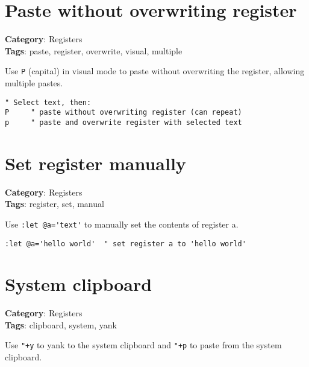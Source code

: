 {{{{{{{{{{\section{Paste without overwriting register}

\textbf{Category}: Registers\\ \textbf{Tags}: paste, register, overwrite, visual, multiple
\vspace{0.5cm}

Use {\footnotesize \Verb§P§} (capital) in visual mode to paste without overwriting the register, allowing multiple pastes.

\begin{Exa*}{}
\begin{Verbatim}[fontsize=\footnotesize, breaklines, breakanywhere]
" Select text, then:
P     " paste without overwriting register (can repeat)
p     " paste and overwrite register with selected text
\end{Verbatim}
\end{Exa*}

\section{Set register manually}

\textbf{Category}: Registers\\ \textbf{Tags}: register, set, manual
\vspace{0.5cm}

Use {\footnotesize \Verb§:let @a='text'§} to manually set the contents of register a.

\begin{Exa*}{}
\begin{Verbatim}[fontsize=\footnotesize, breaklines, breakanywhere]
:let @a='hello world'  " set register a to 'hello world'
\end{Verbatim}
\end{Exa*}

\section{System clipboard}

\textbf{Category}: Registers\\ \textbf{Tags}: clipboard, system, yank
\vspace{0.5cm}

Use {\footnotesize \Verb§"+y§} to yank to the system clipboard and {\footnotesize \Verb§"+p§} to paste from the system clipboard.

}}}}}}}}}}
